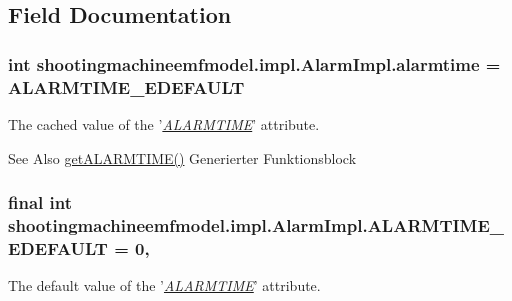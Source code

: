 \subsection{Field Documentation}
\hypertarget{classshootingmachineemfmodel_1_1impl_1_1_alarm_impl_aabc3718d53d5050412741b48266549fb}{
\subsubsection[{alarmtime}]{\setlength{\rightskip}{0pt plus 5cm}int shootingmachineemfmodel.\-impl.\-Alarm\-Impl.\-alarmtime = {\bf A\-L\-A\-R\-M\-T\-I\-M\-E\-\_\-\-E\-D\-E\-F\-A\-U\-L\-T}\hspace{0.3cm}{\ttfamily [protected]}}}\label{classshootingmachineemfmodel_1_1impl_1_1_alarm_impl_aabc3718d53d5050412741b48266549fb}
The cached value of the '\hyperlink{classshootingmachineemfmodel_1_1impl_1_1_alarm_impl_ac79556c6b3f364973719c580860200b3}{{\itshape A\-L\-A\-R\-M\-T\-I\-M\-E}}' attribute.

\begin{DoxySeeAlso}{See Also}
\hyperlink{classshootingmachineemfmodel_1_1impl_1_1_alarm_impl_ac79556c6b3f364973719c580860200b3}{get\-A\-L\-A\-R\-M\-T\-I\-M\-E()} Generierter Funktionsblock  
\end{DoxySeeAlso}
\hypertarget{classshootingmachineemfmodel_1_1impl_1_1_alarm_impl_ab1311546de8d5b8a4a39f776185907f8}{
\subsubsection[{A\-L\-A\-R\-M\-T\-I\-M\-E\-\_\-\-E\-D\-E\-F\-A\-U\-L\-T}]{\setlength{\rightskip}{0pt plus 5cm}final int shootingmachineemfmodel.\-impl.\-Alarm\-Impl.\-A\-L\-A\-R\-M\-T\-I\-M\-E\-\_\-\-E\-D\-E\-F\-A\-U\-L\-T = 0\hspace{0.3cm}{\ttfamily [static]}, {\ttfamily [protected]}}}\label{classshootingmachineemfmodel_1_1impl_1_1_alarm_impl_ab1311546de8d5b8a4a39f776185907f8}
The default value of the '\hyperlink{classshootingmachineemfmodel_1_1impl_1_1_alarm_impl_ac79556c6b3f364973719c580860200b3}{{\itshape A\-L\-A\-R\-M\-T\-I\-M\-E}}' attribute.

